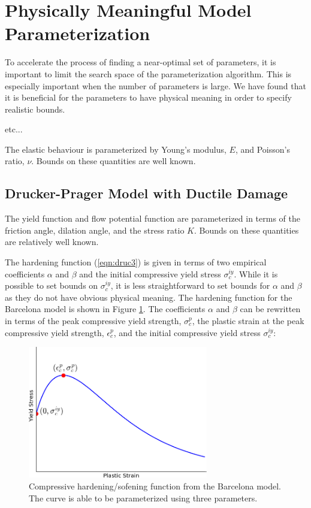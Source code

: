 \section{Physically Meaningful Model Parameterization}
To accelerate the process of finding a near-optimal set of parameters, it is important to limit the search space of the parameterization algorithm. This is especially important when the number of parameters is large. We have found that it is beneficial for the parameters to have physical meaning in order to specify realistic bounds.

etc...

The elastic behaviour is parameterized by Young's modulus, $E$, and Poisson's ratio, $\nu$. Bounds on these quantities are well known. 

\subsection{Drucker-Prager Model with Ductile Damage}
The yield function and flow potential function are parameterized in terms of the friction angle, dilation angle, and the stress ratio $K$. Bounds on these quantities are relatively well known.

The hardening function (\ref{eqn:druc3}) is given in terms of two empirical coefficients $\alpha$ and $\beta$ and the initial compressive yield stress $\sigma_c^{iy}$.  While it is possible to set bounds on $\sigma_c^{iy}$, it is less straightforward to set bounds for $\alpha$ and $\beta$ as they do not have obvious physical meaning. The hardening function for the Barcelona model is shown in Figure \ref{fig:barcelona}. The coefficients $\alpha$ and $\beta$ can be rewritten in terms of the peak compressive yield strength, $\sigma_{c}^{p}$, the plastic strain at the peak compressive yield strength, $\epsilon_c^{p}$, and the initial compressive yield stress $\sigma_c^{iy}$:


\begin{figure}[!htb]
\begin{center}
\includegraphics[width=0.7\textwidth]{figures/3fulllenghtpaddle-1140x642/barcelona}
\caption{{\label{fig:barcelona}Compressive hardening/sofening function from the Barcelona model. The curve is able to be parameterized using three parameters.%
}}
\end{center}
\end{figure}

